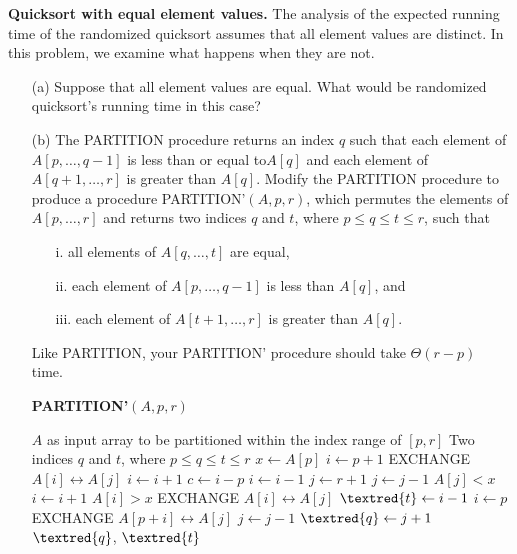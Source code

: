\noindent {} 
\textbf{Quicksort with equal element values.} The analysis of the expected running time of the randomized quicksort assumes that all element values are distinct. In this problem, we examine what happens when they are not.
\begin{itemize}
    \item[(a)] Suppose that all element values are equal. What would be randomized quicksort’s running time in this case? \\
    \item[(b)] The PARTITION procedure returns an index $q$ such that each element of $A[p, \dots, q -1]$ is less than or equal to$ A[q]$ and each element of $A[q + 1, \dots, r]$ is greater than $A[q]$. Modify the PARTITION procedure to produce a procedure PARTITION’$(A, p, r)$, which permutes the elements of $A[p, \dots, r]$ and returns two indices $q$ and $t$, where $p \leq q \leq t \leq r$, such that
    \begin{itemize}
        \item[i.] all elements of $A[q, \dots, t]$ are equal, 
        \item[ii.] each element of $A[p, \dots, q - 1]$ is less than $A[q]$, and 
        \item[iii.] each element of $A[t + 1, \dots, r]$ is greater than $A[q]$.
    \end{itemize}
    Like PARTITION, your PARTITION’ procedure should take $\Theta(r - p)$ time.\\
\begin{algorithm}[!h]
\caption{\textbf{PARTITION'}$(A, p, r)$} \label{alg:partition'}
\begin{algorithmic}[1]
\Require $A$ as input array to be partitioned within the index range of $[p, r]$
\Ensure Two indices $q$ and $t$, where $p \leq q \leq t \leq r$
\State $x \leftarrow A[p]$
\State $i \leftarrow p+1$
        \State EXCHANGE $A[i] \leftrightarrow A[j]$ 
        \State $i \leftarrow i+1$
    \EndIf
\EndFor
\State $c \leftarrow i-p$ 
\State $i \leftarrow i-1$
\State $j \leftarrow r+1$
    \Repeat
        \State $j \leftarrow j-1$
    \Until $A[j] < x$ 
    \Repeat
        \State $i \leftarrow i+1$
    \Until $A[i] > x$ 
        \State EXCHANGE $A[i] \leftrightarrow A[j]$ 
    \Else 
        \State $\textred{t} \leftarrow i-1$
    \EndIf
\EndWhile
\State $i \leftarrow p$
  
    \State EXCHANGE $A[p+i] \leftrightarrow A[j]$ 
    \State $j \leftarrow j-1$
\EndFor
\State $\textred{q} \leftarrow j+1$
\State \Return $\textred{q}$, $\textred{t}$
\end{algorithmic}
\end{algorithm}


\end{itemize}
